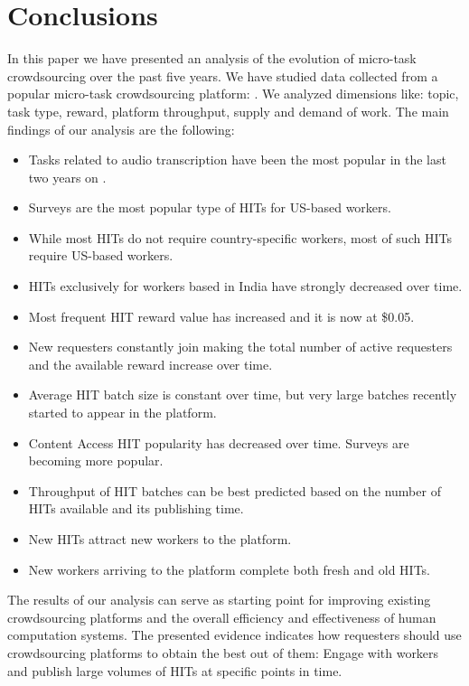 \section{Conclusions}\label{sec:conc}

In this paper we have presented an analysis of the evolution of micro-task crowdsourcing over the past five years.
We have studied data collected from a popular micro-task crowdsourcing platform: \amt{}.
We analyzed dimensions like: topic, task type, reward, platform throughput, supply and demand of work.
The main findings of our analysis are the following:
\begin{itemize}[noitemsep,topsep=0pt,parsep=0pt,partopsep=0pt]
	\item Tasks related to audio transcription have been the most popular in the last two years on \amt{}.
	\item Surveys are the most popular type of HITs for US-based workers.
	\item While most HITs do not require country-specific workers, most of such HITs require US-based workers.
	\item HITs exclusively for workers based in India have strongly decreased over time.
	\item Most frequent HIT reward value has increased and it is now at \$0.05.
	\item New requesters constantly join \amt{} making the total number of active requesters and the available reward increase over time.
	\item Average HIT batch size is constant over time, but very large batches recently started to appear in the platform.
	\item Content Access HIT popularity has decreased over time. Surveys are becoming more popular.
	\item Throughput of HIT batches can be best predicted based on the number of HITs available   and its publishing time.
	\item New HITs attract new workers to the platform.
	\item New workers arriving to the platform complete both fresh and old HITs.
\end{itemize}

The results of our analysis can serve as starting point for improving existing crowdsourcing platforms and the overall efficiency and effectiveness of human computation systems. The presented evidence  indicates how requesters should use crowdsourcing platforms to obtain the best out of them: Engage with workers and publish large volumes of HITs  at specific points in time. 

